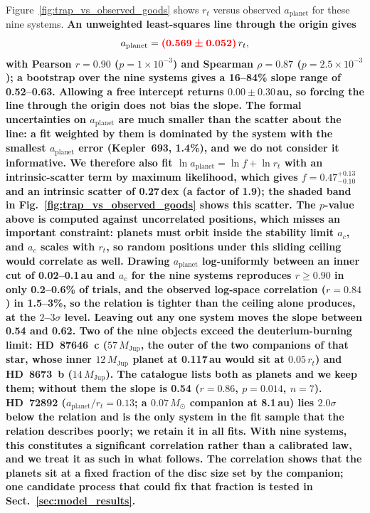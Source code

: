 \documentclass{aa}
\newcommand{\rev}[1]{{\color{red}\textbf{#1}}}
\newcommand{\revm}[1]{{\color{red}\boldsymbol{#1}}}   %
\begin{document}
Figure~\ref{fig:trap_vs_observed_goods} shows $r_t$ versus observed
$a_\mathrm{planet}$ for these nine systems. \rev{An unweighted
least-squares line through the origin gives}
\begin{equation}
    a_\mathrm{planet} = \revm{(0.569 \pm 0.052)}\, r_t,
\end{equation}
\rev{with Pearson $r = 0.90$ ($p = 1\times10^{-3}$) and Spearman
$\rho = 0.87$ ($p = 2.5\times10^{-3}$); a bootstrap over the nine systems
gives a 16--84\% slope range of 0.52--0.63. Allowing a free intercept
returns $0.00 \pm 0.30$\,au, so forcing the line through the origin does
not bias the slope. The formal uncertainties on $a_\mathrm{planet}$ are
much smaller than the scatter about the line: a fit weighted by them is
dominated by the system with the smallest $a_\mathrm{planet}$ error
(Kepler~693, 1.4\%), and we do not consider it informative. We
therefore also fit
$\ln a_\mathrm{planet} = \ln f + \ln r_t$ with an intrinsic-scatter term
by maximum likelihood, which gives $f = 0.47^{+0.13}_{-0.10}$ and an
intrinsic scatter of 0.27\,dex (a factor of 1.9); the shaded band in
Fig.~\ref{fig:trap_vs_observed_goods} shows this scatter. The $p$-value
above is computed against uncorrelated positions, which misses an
important constraint: planets must orbit inside the stability limit $a_c$, and
$a_c$ scales with $r_t$, so random positions under this sliding ceiling
would correlate as well. Drawing $a_\mathrm{planet}$ log-uniformly
between an inner cut of 0.02--0.1\,au and $a_c$ for the nine systems
reproduces $r \geq 0.90$ in only 0.2--0.6\% of trials, and the observed
log-space correlation ($r = 0.84$) in 1.5--3\%, so the relation is
tighter than the ceiling alone produces, at the $2$--$3\sigma$ level.
Leaving out any one system moves the slope between 0.54 and 0.62. Two of
the nine objects exceed the deuterium-burning limit: HD~87646~c
($57\,M_\mathrm{Jup}$, the outer of the two companions of that star,
whose inner $12\,M_\mathrm{Jup}$ planet at 0.117\,au would sit at
$0.05\,r_t$) and HD~8673~b ($14\,M_\mathrm{Jup}$). The catalogue lists
both as planets and we keep them; without them the slope is 0.54
($r = 0.86$, $p = 0.014$, $n = 7$). HD~72892
($a_\mathrm{planet}/r_t = 0.13$; a $0.07\,M_\odot$ companion at 8.1\,au)
lies $2.0\sigma$ below the relation and is the only system in the fit
sample that the relation describes poorly; we retain it in all fits.
With nine systems, this constitutes a significant correlation rather
than a calibrated law, and we treat it as such in what follows. The
correlation shows that the planets sit at a fixed fraction of the disc
size set by the companion; one candidate process that could fix that
fraction is tested in Sect.~\ref{sec:model_results}.}
\end{document}
